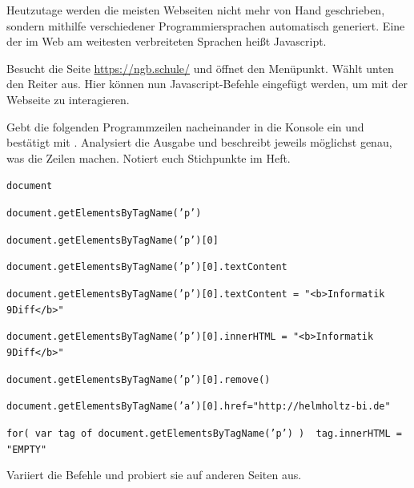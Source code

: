 \documentclass[11pt, a4paper, ngerman]{arbeitsblatt}
\begin{document}
\begin{aufgabe}[subtitle=Webseiten programmieren,icon=\iconPartner\,\iconComputer\,\iconHeft]
	Heutzutage werden die meisten Webseiten nicht mehr von Hand geschrieben, sondern mithilfe verschiedener Programmiersprachen automatisch generiert. Eine der im Web am weitesten verbreiteten Sprachen heißt Javascript.

	Besucht die Seite \url{https://ngb.schule/} und öffnet den  Menüpunkt. Wählt unten den Reiter  aus. Hier können nun Javascript-Befehle eingefügt werden, um mit der Webseite zu interagieren.

	Gebt die folgenden Programmzeilen nacheinander in die Konsole ein und bestätigt mit . Analysiert die Ausgabe und beschreibt jeweils möglichst genau, was die Zeilen machen. Notiert euch Stichpunkte im Heft.

	\begin{smallenum}
		\item \texttt{document}
		\item \texttt{document.getElementsByTagName('p')}
		\item \texttt{document.getElementsByTagName('p')[0]}
		\item \texttt{document.getElementsByTagName('p')[0].textContent}
		\item \texttt{document.getElementsByTagName('p')[0].textContent = "<b>Informatik 9Diff</b>"}
		\item \texttt{document.getElementsByTagName('p')[0].innerHTML = "<b>Informatik 9Diff</b>"}
		\item \texttt{document.getElementsByTagName('p')[0].remove()}
		\item \texttt{document.getElementsByTagName('a')[0].href="http://helmholtz-bi.de"}
		\item \texttt{for( var tag of document.getElementsByTagName('p') ) { tag.innerHTML = "EMPTY" }}
	\end{smallenum}

	Variiert die Befehle und probiert sie auf anderen Seiten aus.
\end{aufgabe}
\end{document}

